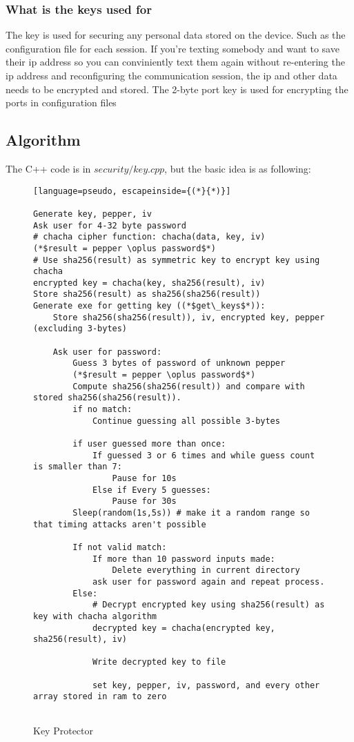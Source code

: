 \documentclass[a4paper,12pt]{article}
\begin{document}
\subsubsection{What is the keys used for}

The key is used for securing any personal data stored on the device. Such as the configuration file for each session. If you're texting somebody and want to save their ip address so you can conviniently text them again without re-entering the ip address and reconfiguring the communication session, the ip and other data needs to be encrypted and stored.
The 2-byte port key is used for encrypting the ports in configuration files

\bigskip
\bigskip
\bigskip
\bigskip
\bigskip
\bigskip
\bigskip
\bigskip

\subsection{Algorithm}
The C++ code is in $security/key.cpp$, but the basic idea is as following:

\begin{figure}[htb]
\begin{small}
\begin{lstlisting}[language=pseudo, escapeinside={(*}{*)}]

Generate key, pepper, iv
Ask user for 4-32 byte password
# chacha cipher function: chacha(data, key, iv)
(*$result = pepper \oplus password$*)
# Use sha256(result) as symmetric key to encrypt key using chacha
encrypted key = chacha(key, sha256(result), iv)
Store sha256(result) as sha256(sha256(result))
Generate exe for getting key ((*$get\_keys$*)):
	Store sha256(sha256(result)), iv, encrypted key, pepper (excluding 3-bytes)

	Ask user for password:
		Guess 3 bytes of password of unknown pepper
		(*$result = pepper \oplus password$*)
		Compute sha256(sha256(result)) and compare with stored sha256(sha256(result)).
		if no match:
			Continue guessing all possible 3-bytes

		if user guessed more than once:
			If guessed 3 or 6 times and while guess count is smaller than 7:
				Pause for 10s
			Else if Every 5 guesses:
				Pause for 30s
		Sleep(random(1s,5s)) # make it a random range so that timing attacks aren't possible

		If not valid match:
			If more than 10 password inputs made:
				Delete everything in current directory
			ask user for password again and repeat process.
		Else:
			# Decrypt encrypted key using sha256(result) as key with chacha algorithm
			decrypted key = chacha(encrypted key, sha256(result), iv)

			Write decrypted key to file

			set key, pepper, iv, password, and every other array stored in ram to zero
			

\end{lstlisting}
\end{small}
\caption{Key Protector}\label{key_protector}
\end{figure}
\end{document}
